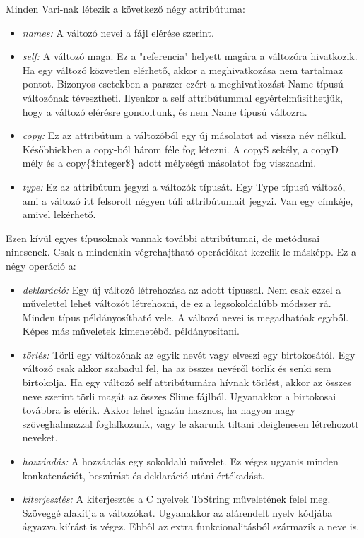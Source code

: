 Minden Vari-nak létezik a következő négy attribútuma:
\begin{itemize}
\item \emph{names:} 
A változó nevei a fájl elérése szerint.
\item \emph{self:} 
A változó maga. 
Ez a "referencia" helyett magára a változóra hivatkozik.
Ha egy változó közvetlen elérhető, akkor a meghivatkozása nem tartalmaz pontot.
Bizonyos esetekben a parszer ezért a meghivatkozást Name típusú változónak tévesztheti.
Ilyenkor a self attribútummal egyértelműsíthetjük, hogy a változó elérésre gondoltunk, és nem Name típusú változra. 
\item \emph{copy:}
Ez az attribútum a változóból egy új másolatot ad vissza név nélkül.
Későbbiekben a copy-ból három féle fog létezni. 
A copyS sekély, a copyD mély és a copy\{\$integer\$\} adott mélységű másolatot fog visszaadni.
\item \emph{type:}
Ez az attribútum jegyzi a változók típusát.
Egy Type típusú változó, ami a változó itt felsorolt négyen túli attribútumait jegyzi.
Van egy címkéje, amivel lekérhető. 
\end{itemize}

Ezen kívül egyes típusoknak vannak további attribútumai, de metódusai nincsenek. 
Csak a mindenkin végrehajtható operációkat kezelik le másképp. 
Ez a négy operáció a:
\begin{itemize}
\item \emph{deklaráció:} 
Egy új változó létrehozása az adott típussal.
Nem csak ezzel a művelettel lehet változót létrehozni, de ez a legsokoldalúbb módszer rá.
Minden típus példányosítható vele.
A változó nevei is megadhatóak egyből.
Képes más műveletek kimenetéből példányosítani.
\item \emph{törlés:} 
Törli egy változónak az egyik nevét vagy elveszi egy birtokosától.
Egy változó csak akkor szabadul fel, ha az összes nevéről törlik és senki sem birtokolja.
Ha egy változó self attribútumára hívnak törlést, akkor az összes neve szerint törli magát az összes Slime fájlból.
Ugyanakkor a birtokosai továbbra is elérik.
Akkor lehet igazán hasznos, ha nagyon nagy szöveghalmazzal foglalkozunk, vagy le akarunk tiltani ideiglenesen létrehozott neveket.
\item \emph{hozzáadás:}
A hozzáadás egy sokoldalú művelet. 
Ez végez ugyanis minden konkatenációt, beszúrást és deklaráció utáni értékadást.
\item \emph{kiterjesztés:}
A kiterjesztés a C nyelvek ToString műveletének felel meg. 
Szöveggé alakítja a változókat.
Ugyanakkor az alárendelt nyelv kódjába ágyazva kiírást is végez. 
Ebből az extra funkcionalitásból származik a neve is.
\end{itemize}

